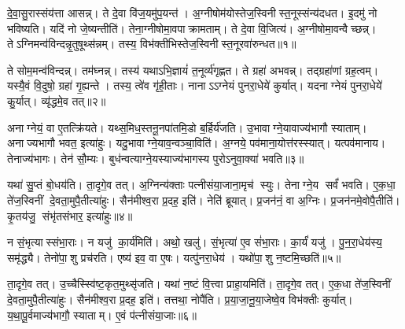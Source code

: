 

\clearpage
{}
\setcounter{anuvakam}{0}
दे॒वा॒सु॒रास्संय॑त्ता आसन्न्। ते दे॒वा वि॑ज॒यमु॑प॒यन्त॑। अ॒ग्नीषोम॑योस्तेज॒स्विनीस्त॒नूस्संन्य॑दधत। इ॒दमु॑ नो भविष्यति। यदि॑ नो जे॒ष्यन्तीति॑। तेना॒ग्नीषोमा॒वपाक्रामताम्। ते दे॒वा वि॒जित्य॑। अ॒ग्नीषोमा॒वन्वैच्छन्न्। तेऽग्निमन्व॑विन्दन्नृ॒तुषूथ्स॑न्नम्। तस्य॒ विभ॑क्तीभिस्तेज॒स्विनीस्त॒नूरवा॑रुन्धत॥१॥

ते सोम॒मन्व॑विन्दन्न्। तम॑घ्नन्न्। तस्य॑ यथाऽभि॒ज्ञायं॑ त॒नूर्व्य॑गृह्णत। ते ग्रहा॑ अभवन्न्। तद्ग्रहा॑णां ग्रह॒त्वम्। यस्यै॒वं वि॒दुषो॒ ग्रहा॑ गृ॒ह्यन्ते। तस्य॒ त्वे॑व गृ॑ही॒ताः। नानाऽऽग्नेयं पुनरा॒धेये॑ कुर्यात्। यदनाग्नेयं पुनरा॒धेये॑ कु॒र्यात्। व्यृ॑द्धमे॒व तत्॥२॥

अनाग्नेयं॒ वा ए॒तत्क्रि॑यते। यथ्स॒मिध॒स्तनू॒नपा॑तमि॒डो ब॒र्\mbox{}हिर्य॑जति। उ॒भावाग्ने॒यावाज्य॑भागौ स्याताम्। अनाज्यभागौ भवत॒ इत्या॑हुः। यदु॒भावाग्ने॒याव॒न्वञ्चा॒विति॑। अ॒ग्नये॒ पव॑माना॒योत्त॑रस्स्यात्। यत्पव॑मानाय। तेनाज्य॑भागः। तेन॑ सौ॒म्यः। बुध॑न्वत्याग्ने॒यस्याज्य॑भागस्य पुरोऽनुवा॒क्या॑ भवति॥३॥

यथा॑ सु॒प्तं बो॒धय॑ति। ता॒दृगे॒व तत्। अ॒ग्निन्य॑क्ताः पत्नीसंया॒जाना॒मृच॑ स्युः। तेनाग्ने॒य सर्वं॑ भवति। ए॒क॒धा॒ ते॑ज॒स्विनीं दे॒वता॒मुपै॒तीत्या॑हुः। सैन॑मीश्व॒रा प्र॒दह॒ इति॑। नेति॑ ब्रूयात्। प्र॒जन॑नं॒ वा अ॒ग्निः। प्र॒जन॑नमे॒वोपै॒तीति॑। कृ॒तय॑जु॒ संभृ॑तसंभार॒ इत्या॑हुः॥४॥

न सं॒भृत्यास्संभा॒राः। न यजु॑ का॒र्य॑मिति॑। अथो॒ खलु॑। सं॒भृत्या॑ ए॒व सं॑भा॒राः। का॒र्यं॑ यजु॑। पु॒न॒रा॒धेय॑स्य॒ समृ॑द्ध्यै। तेनो॑पा॒शु प्रच॑रति। एष्य॑ इव॒ वा ए॒षः। यत्पु॑नरा॒धेय॑। यथो॑पा॒शु न॒ष्टमि॒च्छति॑॥५॥

ता॒दृगे॒व तत्। उ॒च्चैस्स्वि॑ष्ट॒कृत॒मुथ्सृ॑जति। यथा॑ न॒ष्टं वि॒त्त्वा प्राहा॒यमिति॑। ता॒दृगे॒व तत्। ए॒क॒धा ते॑ज॒स्विनीं दे॒वता॒मुपै॒तीत्या॑हुः। सैन॑मीश्व॒रा प्र॒दह॒ इति॑। तत्तथा॒ नोपै॑ति। प्र॒या॒जा॒नू॒या॒जेष्वे॒व विभ॑क्तीः कुर्यात्। य॒था॒पू॒र्वमाज्य॑भागौ॒ स्याताम्। ए॒वं प॑त्नीसंया॒जाः॥६॥

